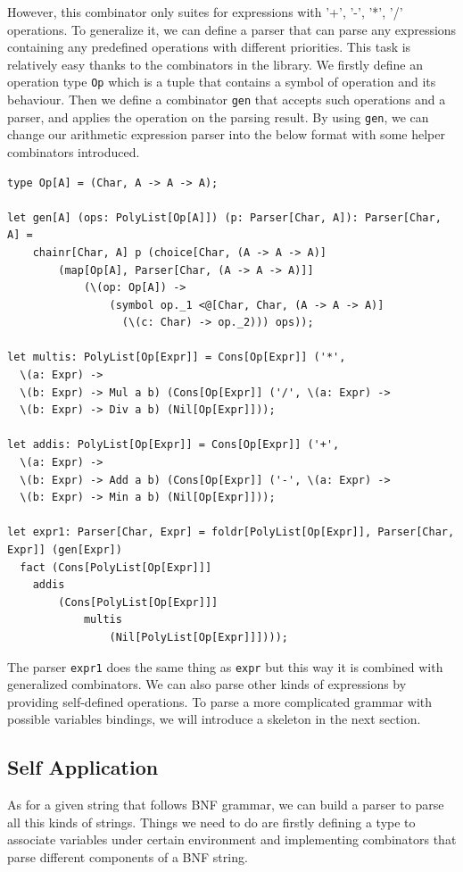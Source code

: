However, this combinator only suites for expressions with '+', '-', '*', '/' operations. To generalize it, we can define a parser that can parse any expressions containing any predefined operations with different priorities. This task is relatively easy thanks to the combinators in the library. We firstly define an operation type \texttt{Op} which is a tuple that contains a symbol of operation and its behaviour. Then we define a combinator \texttt{gen} that accepts such operations and a parser, and applies the operation on the parsing result. By using \texttt{gen}, we can change our arithmetic expression parser into the below format with some helper combinators introduced.

\begin{lstlisting}
type Op[A] = (Char, A -> A -> A);

let gen[A] (ops: PolyList[Op[A]]) (p: Parser[Char, A]): Parser[Char, A] =
    chainr[Char, A] p (choice[Char, (A -> A -> A)]
        (map[Op[A], Parser[Char, (A -> A -> A)]]
            (\(op: Op[A]) ->
                (symbol op._1 <@[Char, Char, (A -> A -> A)]
                  (\(c: Char) -> op._2))) ops));

let multis: PolyList[Op[Expr]] = Cons[Op[Expr]] ('*',
  \(a: Expr) ->
  \(b: Expr) -> Mul a b) (Cons[Op[Expr]] ('/', \(a: Expr) ->
  \(b: Expr) -> Div a b) (Nil[Op[Expr]]));

let addis: PolyList[Op[Expr]] = Cons[Op[Expr]] ('+',
  \(a: Expr) ->
  \(b: Expr) -> Add a b) (Cons[Op[Expr]] ('-', \(a: Expr) ->
  \(b: Expr) -> Min a b) (Nil[Op[Expr]]));

let expr1: Parser[Char, Expr] = foldr[PolyList[Op[Expr]], Parser[Char, Expr]] (gen[Expr])
  fact (Cons[PolyList[Op[Expr]]]
    addis
        (Cons[PolyList[Op[Expr]]]
            multis
                (Nil[PolyList[Op[Expr]]])));
\end{lstlisting}

The parser \texttt{expr1} does the same thing as \texttt{expr} but this way it is combined with generalized combinators. We can also parse other kinds of expressions by providing self-defined operations. To parse a more complicated grammar with possible variables bindings, we will introduce a skeleton in the next section.

\subsection{Self Application}
As for a given string that follows BNF grammar, we can build a parser to parse all this kinds of strings. Things we need to do are firstly defining a type to associate variables under certain environment and implementing combinators that parse different components of a BNF string.

